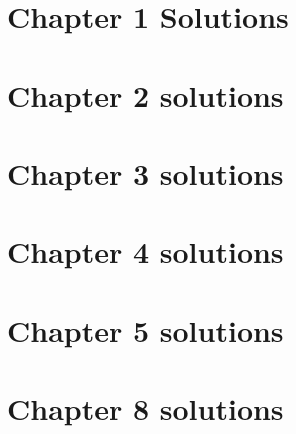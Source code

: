 \documentclass{article}
\begin{document}
\section{Chapter 1 Solutions}

\newpage

\section{Chapter 2 solutions}
\label{sec:chapter-2-solutions}

%



%

%

%

%

%

%

%

%


%

%

%

%

%

%

%


\newpage
\section{Chapter 3 solutions}


\newpage
\section{Chapter 4 solutions}


\newpage
\section{Chapter 5 solutions}



\newpage

\newpage
\section{Chapter 8 solutions}

\end{document}
